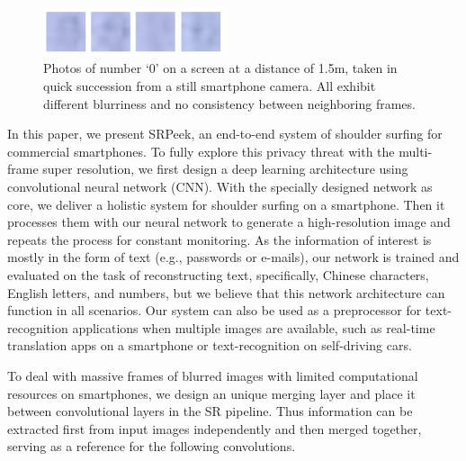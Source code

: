 \begin{figure}
	\centering
	\includegraphics[width=0.48\textwidth]{pic/zeros.png}
    \caption{Photos of number ‘0’ on a screen at a distance of 1.5m, taken in quick succession from a still smartphone camera. All exhibit different blurriness and no consistency between neighboring frames.}
	\label{fig-zeros}
\end{figure}

In this paper, we present \textsf{SRPeek}, an end-to-end system of shoulder surfing for commercial smartphones. To fully explore this privacy threat with the multi-frame super resolution, we first design a deep learning architecture using convolutional neural network (CNN). With the specially designed network as core, we deliver a holistic system for shoulder surfing on a smartphone. Then it processes them with our neural network to generate a high-resolution image and repeats the process for constant monitoring. As the information of interest is mostly in the form of text (e.g., passwords or e-mails), our network is trained and evaluated on the task of reconstructing text, specifically, Chinese characters, English letters, and numbers, but we believe that this network architecture can function in all scenarios. Our system can also be used as a preprocessor for text-recognition applications when multiple images are available, such as real-time translation apps on a smartphone or text-recognition on self-driving cars.

To deal with massive frames of blurred images with limited computational resources on smartphones, we design an unique merging layer and place it between convolutional layers in the SR pipeline. Thus information can be extracted first from input images independently and then merged together, serving as a reference for the following convolutions.

